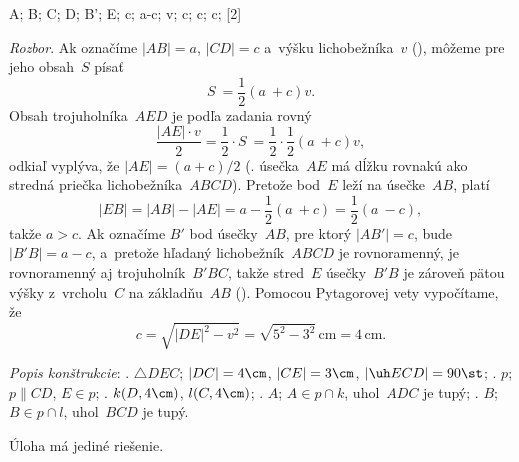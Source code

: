 {%
\fontplace
\tpoint A; \tpoint B; \bpoint C; \bpoint D;
\tpoint B'; \tpoint E;
\tpoint c; \tpoint a-c; \lpoint v;
\lBpoint c; \bpoint c; \rBpoint c;
[2] \hfil\Obr

{\it Rozbor\/}.
Ak označíme $|AB|=a$, $|CD|=c$
\inspicture{}
a~výšku lichobežníka~$v$ (\obr), môžeme pre jeho obsah~$S$ písať
$$
S~= \frac{1}{2}(a~+ c)v.
$$
Obsah trojuholníka~$AED$ je podľa zadania rovný
$$
\frac{{|AE| \cdot v}}{2} = \frac{1}{2} \cdot
S~= \frac{1}{2} \cdot \frac{1}{2}(a~+ c)v,
$$
odkiaľ vyplýva, že $|AE|=(a+c)/2$ (\tj. úsečka~$AE$ má dĺžku rovnakú ako stredná priečka
lichobežníka~$ABCD$). Pretože bod~$E$ leží na úsečke~$AB$, platí
$$
|EB| = |AB| - |AE| =
a- \frac{1}{2}(a~+ c) = \frac{1}{2}(a~- c),
$$
takže $a > c$. Ak označíme $B'$ bod úsečky~$AB$, pre ktorý
$|AB'|=c$, bude $|B'B|=a-c$, a~pretože hľadaný lichobežník~$ABCD$
je rovnoramenný, je rovnoramenný aj trojuholník~$B'BC$, takže stred~$E$
úsečky~$B'B$ je zároveň pätou výšky z~vrcholu~$C$ na základňu~$AB$ ().
Pomocou Pytagorovej vety vypočítame, že
$$
c = \sqrt {|DE|^2  - v^2 }
= \sqrt {5^2  - 3^2}\,{\text{cm}} =4\,\text{cm}.
$$

\noindent
{\it Popis konštrukcie\/}:
.  $\triangle DEC$; $|DC| = 4\cm$, $|CE| =3\cm$, $|\uh ECD|=90\st$;
.  $p$;  $p\parallel CD$, $E\in p$;
.  $k(D,4\cm)$, $l(C,4\cm)$;
.  $A$;  $A\in p\cap k$, uhol~$ADC$ je tupý;
.  $B$; $B\in p\cap l$, uhol~$BCD$ je tupý.

\noindent
Úloha má jediné riešenie.}

